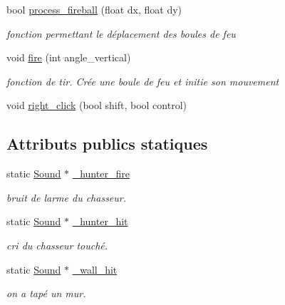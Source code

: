 \begin{DoxyCompactItemize}
bool \hyperlink{classChasseur_a00710f53a84dfcf6ae60deed589cea1e}{process\+\_\+fireball} (float dx, float dy)
\begin{DoxyCompactList}\small\item\em fonction permettant le déplacement des boules de feu \end{DoxyCompactList}\item 
void \hyperlink{classChasseur_ae4610a58bb02ee492e8bdfbee917db8a}{fire} (int angle\+\_\+vertical)
\begin{DoxyCompactList}\small\item\em fonction de tir. Crée une boule de feu et initie son mouvement \end{DoxyCompactList}\item 
void \hyperlink{classChasseur_ac33c7c026b2bb1c05d074fa196bd1fae}{right\+\_\+click} (bool shift, bool control)
\end{DoxyCompactItemize}
\subsection*{Attributs publics statiques}
\begin{DoxyCompactItemize}
\item 
static \hyperlink{classSound}{Sound} $\ast$ \hyperlink{classChasseur_aec2e8b81e3f949dc7840bfcab9c3799a}{\+\_\+hunter\+\_\+fire}
\begin{DoxyCompactList}\small\item\em bruit de l\textquotesingle{}arme du chasseur. \end{DoxyCompactList}\item 
static \hyperlink{classSound}{Sound} $\ast$ \hyperlink{classChasseur_ab468d04c50ea338d604e87d5f6db3801}{\+\_\+hunter\+\_\+hit}
\begin{DoxyCompactList}\small\item\em cri du chasseur touché. \end{DoxyCompactList}\item 
static \hyperlink{classSound}{Sound} $\ast$ \hyperlink{classChasseur_a936a0739b4a010ee72191b65b908822a}{\+\_\+wall\+\_\+hit}
\begin{DoxyCompactList}\small\item\em on a tapé un mur. \end{DoxyCompactList}\end{DoxyCompactItemize}

